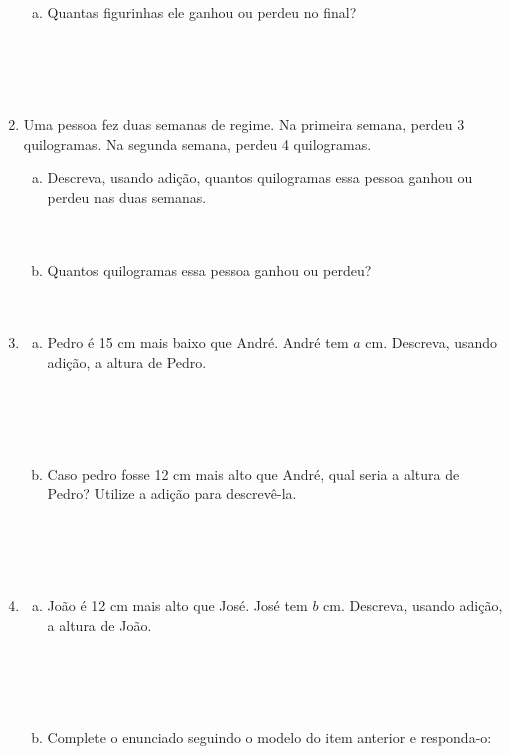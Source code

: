 \documentclass[a4paper,14pt]{article}
\begin{document}
\begin{multicols}{2}
\begin{enumerate}
\begin{enumerate}[a)]
    			\item Quantas figurinhas ele ganhou ou perdeu no final? \\\\\\\\\\
    		\end{enumerate}
    		\item Uma pessoa fez duas semanas de regime. Na primeira semana, perdeu 3 quilogramas. Na segunda semana, perdeu 4 quilogramas.
    		\begin{enumerate}[a)]
    			\item Descreva, usando adição, quantos quilogramas essa pessoa ganhou ou perdeu nas duas semanas. \\\\\\
    			\item Quantos quilogramas essa pessoa ganhou ou perdeu? \\\\\\
    		\end{enumerate}
    		\item \begin{enumerate}[a)]
    			\item Pedro é 15 cm mais baixo que André. André tem $a$ cm. Descreva, usando adição, a altura de Pedro. \\\\\\\\\\
    			\item Caso pedro fosse 12 cm mais alto que André, qual seria a altura de Pedro? Utilize a adição para descrevê-la. \\\\\\\\\\
    		\end{enumerate}
    		\item \begin{enumerate}[a)]
    			\item João é 12 cm mais alto que José. José tem $b$ cm. Descreva, usando adição, a altura de João. \\\\\\\\\\
    			\item Complete o enunciado seguindo o modelo do item anterior e responda-o: \\

\end{enumerate}
\end{enumerate}
\end{multicols}
\end{document}
